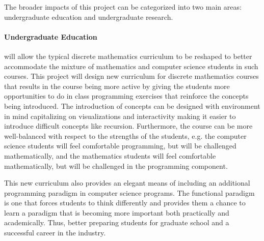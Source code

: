 The broader impacts of this project can be categorized into two main
areas: undergraduate education and undergraduate research.

\paragraph{Undergraduate Education}  \thelang will allow the typical
discrete mathematics curriculum to be reshaped to better accommodate
the mixture of mathematics and computer science students in such
courses.  This project will design new curriculum for discrete
mathematics courses that results in the course being more active by
giving the students more opportunities to do in class programming
exercises that reinforce the concepts being introduced.  The
introduction of concepts can be designed with \thelang environment
in mind capitalizing on visualizations and interactivity making it
easier to introduce difficult concepts like recursion.  Furthermore,
the course can be more well-balanced with respect to the strengths of
the students, e.g. the computer science students will feel comfortable
programming, but will be challenged mathematically, and the
mathematics students will feel comfortable mathematically, but will be
challenged in the programming component.

This new curriculum also provides an elegant means of including an
additional programming paradigm in computer science programs.  The
functional paradigm is one that forces students to think differently
and provides them a chance to learn a paradigm that is becoming more
important both practically and academically.  Thus, better preparing
students for graduate school and a successful career in the industry.


